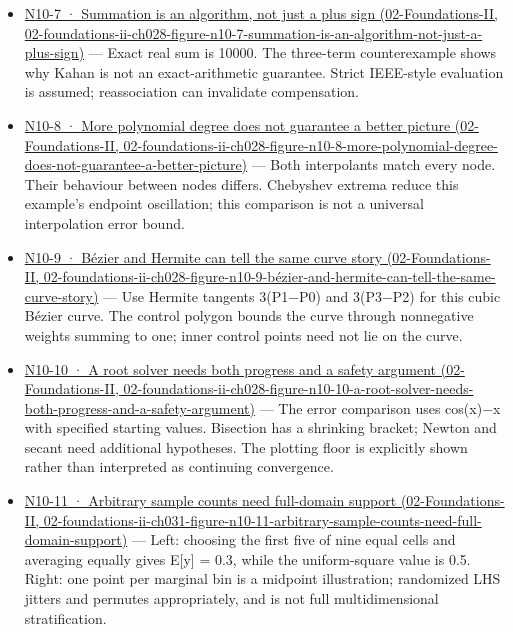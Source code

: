 \begin{itemize}
\item
  \href{../02-Foundations-II/main.pdf\#nameddest=02-foundations-ii-ch028-figure-n10-7-summation-is-an-algorithm-not-just-a-plus-sign}{N10-7 · Summation is an algorithm, not just a plus sign (02-Foundations-II, 02-foundations-ii-ch028-figure-n10-7-summation-is-an-algorithm-not-just-a-plus-sign)} --- Exact real sum is 10000. The three-term counterexample shows why Kahan is not an exact-arithmetic guarantee. Strict IEEE-style evaluation is assumed; reassociation can invalidate compensation.
\item
  \href{../02-Foundations-II/main.pdf\#nameddest=02-foundations-ii-ch028-figure-n10-8-more-polynomial-degree-does-not-guarantee-a-better-picture}{N10-8 · More polynomial degree does not guarantee a better picture (02-Foundations-II, 02-foundations-ii-ch028-figure-n10-8-more-polynomial-degree-does-not-guarantee-a-better-picture)} --- Both interpolants match every node. Their behaviour between nodes differs. Chebyshev extrema reduce this example's endpoint oscillation; this comparison is not a universal interpolation error bound.
\item
  \href{../02-Foundations-II/main.pdf\#nameddest=02-foundations-ii-ch028-figure-n10-9-bézier-and-hermite-can-tell-the-same-curve-story}{N10-9 · Bézier and Hermite can tell the same curve story (02-Foundations-II, 02-foundations-ii-ch028-figure-n10-9-bézier-and-hermite-can-tell-the-same-curve-story)} --- Use Hermite tangents 3(P1−P0) and 3(P3−P2) for this cubic Bézier curve. The control polygon bounds the curve through nonnegative weights summing to one; inner control points need not lie on the curve.
\item
  \href{../02-Foundations-II/main.pdf\#nameddest=02-foundations-ii-ch028-figure-n10-10-a-root-solver-needs-both-progress-and-a-safety-argument}{N10-10 · A root solver needs both progress and a safety argument (02-Foundations-II, 02-foundations-ii-ch028-figure-n10-10-a-root-solver-needs-both-progress-and-a-safety-argument)} --- The error comparison uses cos(x)−x with specified starting values. Bisection has a shrinking bracket; Newton and secant need additional hypotheses. The plotting floor is explicitly shown rather than interpreted as continuing convergence.
\item
  \href{../02-Foundations-II/main.pdf\#nameddest=02-foundations-ii-ch031-figure-n10-11-arbitrary-sample-counts-need-full-domain-support}{N10-11 · Arbitrary sample counts need full-domain support (02-Foundations-II, 02-foundations-ii-ch031-figure-n10-11-arbitrary-sample-counts-need-full-domain-support)} --- Left: choosing the first five of nine equal cells and averaging equally gives E{[}y{]} = 0.3, while the uniform-square value is 0.5. Right: one point per marginal bin is a midpoint illustration; randomized LHS jitters and permutes appropriately, and is not full multidimensional stratification.

\end{itemize}
